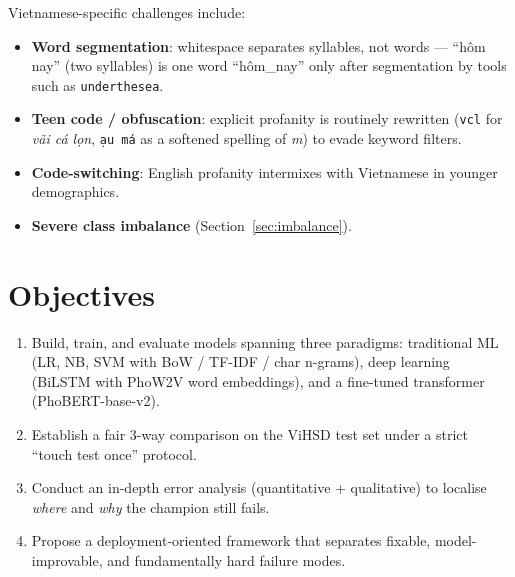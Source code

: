 \documentclass[a4paper,12pt,oneside]{report}
\begin{document}
Vietnamese-specific challenges include:
\begin{itemize}
  \item \textbf{Word segmentation}: whitespace separates syllables, not
        words --- ``h\^om nay'' (two syllables) is one word ``h\^om\_nay''
        only after segmentation by tools such as \texttt{underthesea}.
  \item \textbf{Teen code / obfuscation}: explicit profanity is routinely
        rewritten (\texttt{vcl} for \emph{v\~ai c\'a l\d{o}n},
        \texttt{\dj\d{a}u m\'a} as a softened spelling of \emph{\dj m}) to
        evade keyword filters.
  \item \textbf{Code-switching}: English profanity intermixes with
        Vietnamese in younger demographics.
  \item \textbf{Severe class imbalance} (Section~\ref{sec:imbalance}).
\end{itemize}

\section{Objectives}
\begin{enumerate}
  \item Build, train, and evaluate models spanning three paradigms:
        traditional ML (LR, NB, SVM with BoW / TF-IDF / char n-grams),
        deep learning (BiLSTM with PhoW2V word embeddings), and a
        fine-tuned transformer (PhoBERT-base-v2).
  \item Establish a fair 3-way comparison on the ViHSD test set under a
        strict ``touch test once'' protocol.
  \item Conduct an in-depth error analysis (quantitative + qualitative)
        to localise \emph{where} and \emph{why} the champion still fails.
  \item Propose a deployment-oriented framework that separates fixable,
        model-improvable, and fundamentally hard failure modes.
\end{enumerate}
\end{document}
